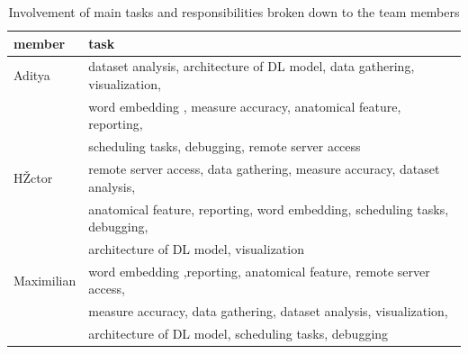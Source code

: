 \documentclass[a4paper,11pt]{article}
\begin{document}
\begin{table}[h!]
\centering
 \begin{tabular}{l |l}
 member 		& task \\ \hline
 Aditya		&  dataset analysis, architecture of DL model, data gathering, visualization, \\ 
 			& word embedding , measure accuracy, anatomical feature, reporting,  \\
			& scheduling tasks, debugging, remote server access\\ \hline
 HŽctor 		&  remote server access, data gathering, measure accuracy, dataset analysis,\\
 			& anatomical feature, reporting, word embedding, scheduling tasks, debugging, \\
			& architecture of DL model, visualization\\ \hline
 Maximilian 	& word embedding ,reporting, anatomical feature, remote server access,\\
 			& measure accuracy, data gathering, dataset analysis, visualization, \\
			& architecture of DL model, scheduling tasks, debugging
 \end{tabular}
 \captionsetup{justification=centering,margin=2cm}
 \caption{Involvement of main tasks and responsibilities broken down to the team members}
 \label{tab:roles}
\end{table}

\end{document}
